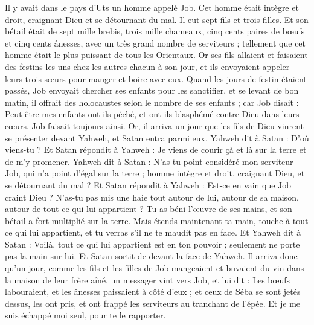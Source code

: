 \begin{multicols}{2}
\VerseOne{}Il y avait dans le pays d'Uts un homme appelé Job. Cet homme était intègre et droit, craignant Dieu et se détournant du mal.
Il eut sept fils et trois filles.
Et son bétail était de sept mille brebis, trois mille chameaux, cinq cents paires de bœufs et cinq cents ânesses, avec un très grand nombre de serviteurs ; tellement que cet homme était le plus puissant de tous les Orientaux.
Or ses fils allaient et faisaient des festins les uns chez les autres chacun à son jour, et ils envoyaient appeler leurs trois sœurs pour manger et boire avec eux.
Quand les jours de festin étaient passés, Job envoyait chercher ses enfants pour les sanctifier, et se levant de bon matin, il offrait des holocaustes selon le nombre de ses enfants ; car Job disait : Peut-être mes enfants ont-ils péché, et ont-ils blasphémé contre Dieu dans leurs cœurs. Job faisait toujours ainsi.
Or, il arriva un jour que les fils de Dieu vinrent se présenter devant Yahweh, et Satan entra parmi eux.
Yahweh dit à Satan : D'où viens-tu ? Et Satan répondit à Yahweh : Je viens de courir çà et là sur la terre et de m'y promener.
Yahweh dit à Satan : N'as-tu point considéré mon serviteur Job, qui n'a point d'égal sur la terre ; homme intègre et droit, craignant Dieu, et se détournant du mal ?
Et Satan répondit à Yahweh : Est-ce en vain que Job craint Dieu ?
N'as-tu pas mis une haie tout autour de lui, autour de sa maison, autour de tout ce qui lui appartient ? Tu as béni l'œuvre de ses mains, et son bétail a fort multiplié sur la terre.
Mais étends maintenant ta main, touche à tout ce qui lui appartient, et tu verras s'il ne te maudit pas en face.
Et Yahweh dit à Satan : Voilà, tout ce qui lui appartient est en ton pouvoir ; seulement ne porte pas la main sur lui. Et Satan sortit de devant la face de Yahweh.
Il arriva donc qu'un jour, comme les fils et les filles de Job mangeaient et buvaient du vin dans la maison de leur frère aîné, un messager vint vers Job,
et lui dit : Les bœufs labouraient, et les ânesses paissaient à côté d'eux ;
et ceux de Séba se sont jetés dessus, les ont pris, et ont frappé les serviteurs au tranchant de l'épée. Et je me suis échappé moi seul, pour te le rapporter.

\end{multicols}
